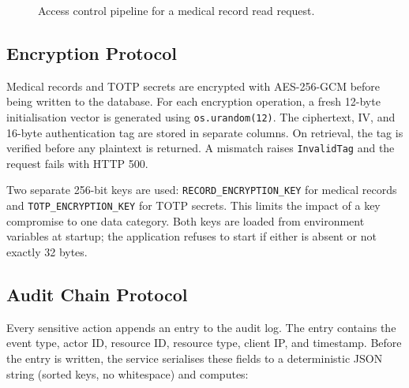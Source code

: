 \documentclass[11pt,a4paper]{article}
\begin{document}
\begin{figure}[H]
\centering
{}
\caption{Access control pipeline for a medical record read request.}
\label{fig:pipeline}
\end{figure}

\subsection{Encryption Protocol}

Medical records and TOTP secrets are encrypted with AES-256-GCM before
being written to the database. For each encryption operation, a fresh
12-byte initialisation vector is generated using \texttt{os.urandom(12)}.
The ciphertext, IV, and 16-byte authentication tag are stored in separate
columns. On retrieval, the tag is verified before any plaintext is returned.
A mismatch raises \texttt{InvalidTag} and the request fails with HTTP 500.

Two separate 256-bit keys are used: \texttt{RECORD\_ENCRYPTION\_KEY} for
medical records and \texttt{TOTP\_ENCRYPTION\_KEY} for TOTP secrets.
This limits the impact of a key compromise to one data category.
Both keys are loaded from environment variables at startup; the application
refuses to start if either is absent or not exactly 32 bytes.

\subsection{Audit Chain Protocol}

Every sensitive action appends an entry to the audit log. The entry
contains the event type, actor ID, resource ID, resource type, client IP,
and timestamp. Before the entry is written, the service serialises these
fields to a deterministic JSON string (sorted keys, no whitespace) and
computes:
\end{document}
